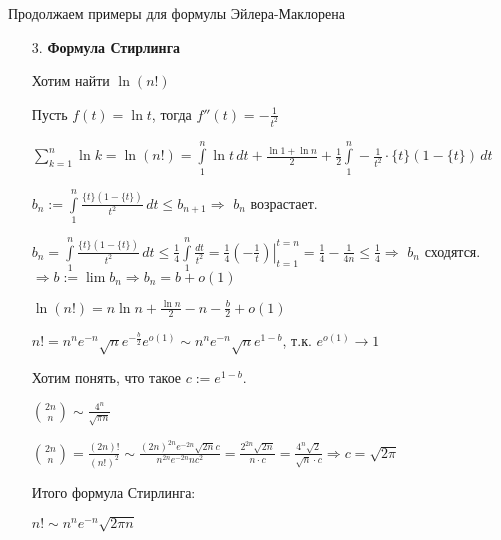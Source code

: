 Продолжаем примеры для формулы Эйлера-Маклорена
\begin{example} \thmslashn
\begin{enumerate}
    \item[3.] \textbf{Формула Стирлинга}
    
    Хотим найти $\ln (n!)$
    
    Пусть $f(t) = \ln t$, тогда $f''(t) = -\frac{1}{t^2}$
    
    $\sum\limits_{k=1}^{n} \ln k = \ln (n!) = \int\limits_{1}^{n} \ln t \,dt + \frac{\ln 1 + \ln n}{2} + \frac{1}{2} \int\limits_{1}^{n} -\frac{1}{t^2} \cdot \{t\}(1 - \{t\})\,dt$
    
    $b_n := \int\limits_{1}^{n} \frac{\{t\}(1 - \{t\})}{t^2}\,dt \leqslant b_{n+1} \Rightarrow$ $b_n$ возрастает.
    
    $b_n = \int\limits_{1}^{n} \frac{\{t\}(1 - \{t\})}{t^2}\,dt \leqslant \frac{1}{4}\int\limits_{1}^{n} \frac{dt}{t^2} = \left.\frac{1}{4} \left( -\frac{1}{t} \right) \right|_{t=1}^{t=n} = \frac{1}{4} - \frac{1}{4n} \leqslant \frac{1}{4} \Rightarrow$ $b_n$ сходятся. $\Rightarrow b:= \lim b_n \Rightarrow b_n = b + o(1)$
    
    $\ln(n!) = n\ln n + \frac{\ln n}{2} -n -\frac{b}{2} + o(1)$
    
    $n! = n^n e^{-n} \sqrt{n} e^{-\frac{b}{2}} e^{o(1)} \sim n^ne^{-n}\sqrt{n}e^{1-b}$, т.к. $e^{o(1)} \to 1$
    
    Хотим понять, что такое $c := e^{1-b}$.
    
    $\binom{2n}{n} \sim \frac{4^n}{\sqrt{\pi n}}$
    
    $\binom{2n}{n} = \frac{(2n)!}{(n!)^2} \sim \frac{(2n)^{2n} e^{-2n}\sqrt{2n} c}{n^{2n} e^{-2n} n c^2} = \frac{2^{2n} \sqrt{2n}}{n\cdot c} = \frac{4^n \sqrt{2}}{\sqrt{n} \cdot c} \Rightarrow c = \sqrt{2 \pi}$
    
    
    Итого формула Стирлинга:
    
    $n! \sim n^ne^{-n}\sqrt{2 \pi n}$
    
\end{enumerate}
\end{example}